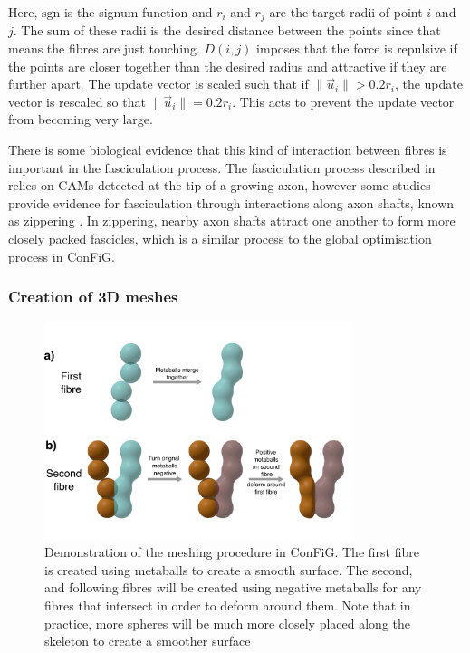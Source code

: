 Here, $\mathrm{sgn}$ is the signum function and $r_i$ and $r_j$ are the target radii of point $i$ and $j$. The sum of these radii is the desired distance between the points since that means the fibres are just touching. $D(i,j)$ imposes that the force is repulsive if the points are closer together than the desired radius and attractive if they are further apart. The update vector is scaled such that if $\|\vec{u}_i\| > 0.2r_i$, the update vector is rescaled so that $\|\vec{u}_i\|=0.2r_i$. This acts to prevent the update vector from becoming very large.

There is some biological evidence that this kind of interaction between fibres is important in the fasciculation process. The fasciculation process described in  relies on CAMs detected at the tip of a growing axon, however some studies provide evidence for fasciculation through interactions along axon shafts, known as zippering \cite{Barry2010,Smit2017,Voyiadjis2011}. In zippering, nearby axon shafts attract one another to form more closely packed fascicles, which is a similar process to the global optimisation process in ConFiG.

\subsubsection{Creation of 3D meshes}
\label{sec:config_meshing}

\begin{figure}
  \centering
  \includegraphics[width=0.8\textwidth]{figures/config/METABALL_fig.png}
  \caption[ConFiG meshing procedure]{Demonstration of the meshing procedure in ConFiG. The first fibre is created using metaballs to create a smooth surface. The second, and following fibres will be created using negative metaballs for any fibres that intersect in order to deform around them. Note that in practice, more spheres will be much more closely placed along the skeleton to create a smoother surface}
  \label{fig:config_meshing}
\end{figure}

